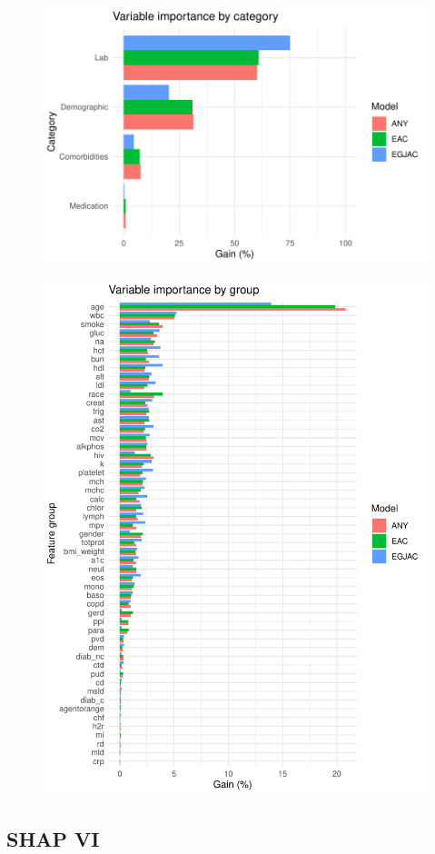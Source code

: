 \documentclass[english]{article}
\begin{document}
\begin{figure}[ht]
\includegraphics[width=0.8\linewidth]{variable_importance/vi_cat.pdf}
\end{figure}
\begin{figure}[ht]
\includegraphics[width=0.8\linewidth]{variable_importance/vi_group.pdf}
\end{figure}

\newpage
\clearpage
\subsection{SHAP VI}
\end{document}
